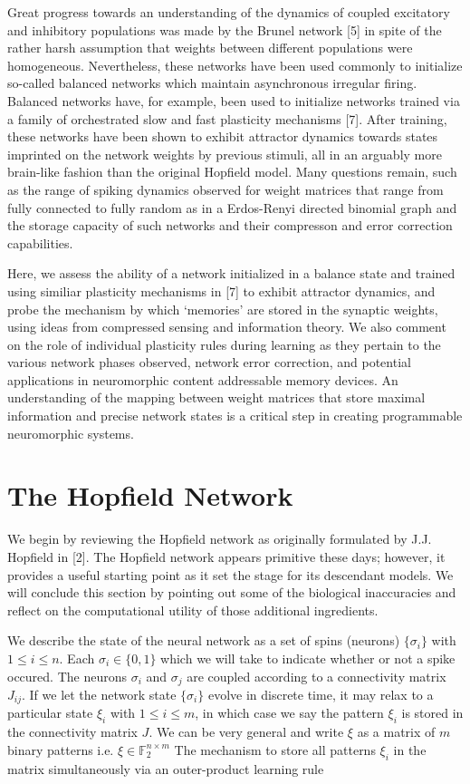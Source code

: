 \documentclass{article} %
\begin{document}
Great progress towards an understanding of the dynamics of coupled excitatory and inhibitory populations was made by the Brunel network [5] in spite of the rather harsh assumption that weights between different populations were homogeneous. Nevertheless, these networks have been used commonly to initialize so-called balanced networks which maintain asynchronous irregular firing. Balanced networks have, for example, been used to initialize networks trained via a family of orchestrated slow and fast plasticity mechanisms [7]. After training, these networks have been shown to exhibit attractor dynamics towards states imprinted on the network weights by previous stimuli, all in an arguably more brain-like fashion than the original Hopfield model. Many questions remain, such as the range of spiking dynamics observed for weight matrices that range from fully connected to fully random as in a Erdos-Renyi directed binomial graph and the storage capacity of such networks and their compresson and error correction capabilities.

Here, we assess the ability of a network initialized in a balance state and trained using similiar plasticity mechanisms in [7] to exhibit attractor dynamics, and probe the mechanism by which `memories' are stored in the synaptic weights, using ideas from compressed sensing and information theory. We also comment on the role of individual plasticity rules during learning as they pertain to the various network phases observed, network error correction, and potential applications in neuromorphic content addressable memory devices. An understanding of the mapping between weight matrices that store maximal information and precise network states is a critical step in creating programmable neuromorphic systems.

\section{The Hopfield Network}

We begin by reviewing the Hopfield network as originally formulated by J.J. Hopfield in [2]. The Hopfield network appears primitive these days; however, it provides a useful starting point as it set the stage for its descendant models. We will conclude this section by pointing out some of the biological inaccuracies and reflect on the computational utility of those additional ingredients.

We describe the state of the neural network as a set of spins (neurons) $\{\sigma_{i}\}$ with $1 \leq i \leq n$. Each $\sigma_{i} \in \{0,1\}$  which we will take to indicate whether or not a spike occured. The neurons $\sigma_{i}$ and $\sigma_{j}$ are coupled according to a connectivity matrix $J_{ij}$. If we let the network state $\{\sigma_{i}\}$ evolve in discrete time, it may relax to a particular state $\xi_{i}$ with $1 \leq i \leq m$, in which case we say the pattern $\xi_{i}$ is stored in the connectivity matrix $J$. We can be very general and write $\xi$ as a matrix of $m$ binary patterns i.e. $\xi \in \mathbb{F}_{2}^{n\times m}$ The mechanism to store all patterns $\xi_{i}$ in the matrix simultaneously via an outer-product learning rule
\end{document}
